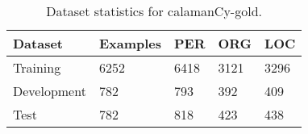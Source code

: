 \documentclass[../emnlp.tex]{subfiles}
\begin{document}
\begin{table}[t]
\begin{tabular}{@{}lllll@{}}
\toprule
Dataset     & Examples & PER  & ORG  & LOC  \\ \midrule
Training    & 6252     & 6418 & 3121 & 3296 \\
Development & 782      & 793  & 392  & 409  \\
Test        & 782      & 818  & 423  & 438  \\ \bottomrule
\end{tabular}
\caption{Dataset statistics for calamanCy-gold.}
\label{table:dset_stats}
\end{table}
\end{document}
